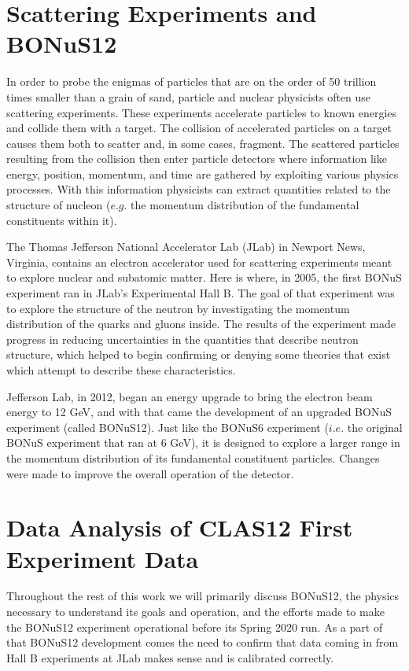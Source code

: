  \section{Scattering Experiments and BONuS12}
 In order to probe the enigmas of particles that are on the order of 50 trillion times smaller than a grain of sand, particle and nuclear physicists often use scattering experiments. These experiments accelerate particles to known energies and collide them with a target.  The collision of accelerated particles on a target causes them both to scatter and, in some cases, fragment. The scattered particles resulting from the collision then enter particle detectors where information like energy, position, momentum, and time are gathered by exploiting various physics processes. With this information physicists can extract quantities related to the structure of nucleon ($e.g.$ the momentum distribution of the fundamental constituents within it).
 
 The Thomas Jefferson National Accelerator Lab (JLab) in Newport News, Virginia, contains an electron accelerator used for scattering experiments meant to explore nuclear and subatomic matter. Here is where, in 2005, the first BONuS experiment ran in JLab's Experimental Hall B. The goal of that experiment was to explore the structure of the neutron by investigating the momentum distribution of the quarks and gluons inside. The results of the experiment made progress in reducing uncertainties in the quantities that describe neutron structure, which helped to begin confirming or denying some theories that exist which attempt to describe these characteristics.
 
 Jefferson Lab, in 2012, began an energy upgrade to bring the electron beam energy to 12 GeV, and with that came the development of an upgraded BONuS experiment (called BONuS12). Just like the BONuS6 experiment ($i.e.$ the original BONuS experiment that ran at 6 GeV), it is designed to explore a larger range in the momentum distribution of its fundamental constituent particles. Changes were made to improve the overall operation of the detector.
 
 \newpage
\section{Data Analysis of CLAS12 First Experiment Data}
Throughout the rest of this work we will primarily discuss BONuS12, the physics necessary to understand its goals and operation, and the efforts made to make the BONuS12 experiment operational before its Spring 2020 run. As a part of that BONuS12 development comes the need to confirm that data coming in from Hall B experiments at JLab makes sense and is calibrated correctly. 

